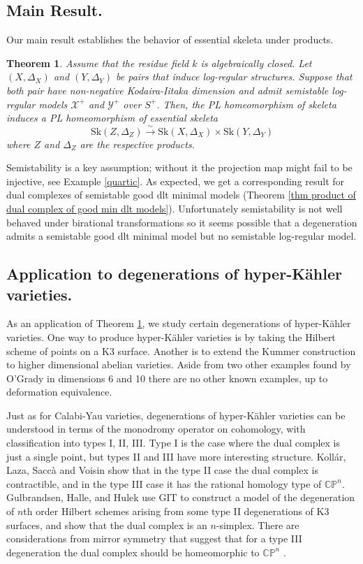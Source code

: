 \documentclass{amsart}%
\numberwithin{equation}{subsection}
\theoremstyle{plain2}
\newtheorem{theorem}[equation]{Theorem}
\theoremstyle{definition2}
\theoremstyle{stepstyle}
\theoremstyle{point}
\theoremstyle{subpoint}
\newcommand{\cX}{\ensuremath{\mathscr{X}}}
\newcommand{\cY}{\ensuremath{\mathscr{Y}}}
\renewcommand{\cY}{\ensuremath{\mathscr{Y}}}
\newcommand{\Sk}{\mathrm{Sk}}
\begin{document}
\subsection{Main Result.} Our main result establishes the behavior of essential skeleta under products.
\begin{theorem}\label{main thm intro}Assume that the residue field $k$ is algebraically closed. Let $(X,\Delta_X)$ and $(Y,\Delta_Y)$ be pairs that induce log-regular structures. Suppose that both pair have non-negative Kodaira-Iitaka dimension and admit semistable log-regular models $\cX^+$ and $\cY^+$ over $S^+$. Then, the PL homeomorphism of skeleta induces a PL homeomorphism of essential skeleta $$\Sk(Z,\Delta_Z) \xrightarrow{\sim} \Sk(X,\Delta_X) \times \Sk(Y,\Delta_Y)$$ where $Z$ and $\Delta_Z$ are the respective products. 
\end{theorem}
Semistability is a key assumption; without it the projection map might fail to be injective, see Example \ref{quartic}. As expected, we get a corresponding result for dual complexes of semistable good dlt minimal models (Theorem \ref{thm product of dual complex of good min dlt models}). Unfortunately semistability is not well behaved under birational transformations so it seems possible that a degeneration admits a semistable good dlt minimal model but no semistable log-regular model.

\subsection{Application to degenerations of hyper-K{\"a}hler varieties.}

As an application of Theorem \ref{main thm intro}, we study certain degenerations of hyper-K{\"a}hler varieties. One way to produce hyper-K{\"a}hler varieties is by taking the Hilbert scheme of points on a K3 surface. Another is to extend the Kummer construction to higher dimensional abelian varieties. Aside from two other examples found by O'Grady in dimensions 6 \cite{OGrady} and 10 \cite{OGradya} there are no other known examples, up to deformation equivalence.

Just as for Calabi-Yau varieties, degenerations of hyper-K{\"a}hler varieties can be understood in terms of the monodromy operator on cohomology, with classification into types I, II, III. Type I is the case where the dual complex is just a single point, but types II and III have more interesting structure. Koll{\'a}r, Laza, Sacc{\`a} and Voisin \cite{KollarLazaSaccaEtAl2017} show that in the type II case the dual complex is contractible, and in the type III case it has the rational homology type of $\mathbb{C}\mathbb{P}^n$. Gulbrandsen, Halle, and Hulek  \cite{GulbrandsenHalleHulek} use GIT to construct a model of the degeneration of $n$th order Hilbert schemes arising from some type II degenerations of K3 surfaces, and show that the dual complex is an $n$-simplex. There are considerations from mirror symmetry that suggest that for a type III degeneration the dual complex should be homeomorphic to $\mathbb{C}\mathbb{P}^n$ \cite{Hwang, KontsevichSoibelman}.
\end{document}
